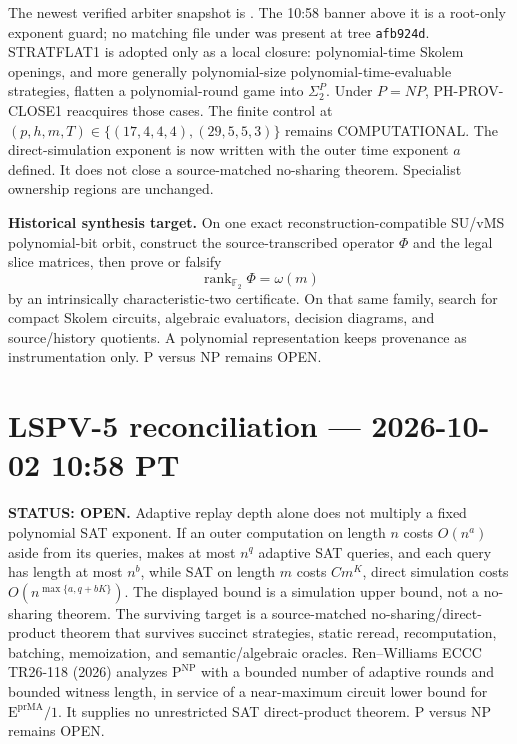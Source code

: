 \documentclass[11pt]{article}
\begin{document}
The newest verified arbiter snapshot is
. The 10:58 banner above it is a root-only
exponent guard; no matching file under  was present at tree
\texttt{afb924d}. STRATFLAT1 is adopted only as a local closure: polynomial-time Skolem
openings, and more generally polynomial-size polynomial-time-evaluable strategies, flatten a
polynomial-round game into $\Sigma_2^P$. Under $P=NP$, PH-PROV-CLOSE1 reacquires those cases.
The finite control at $(p,h,m,T)\in\{(17,4,4,4),(29,5,5,3)\}$ remains COMPUTATIONAL.
The direct-simulation exponent is now written with the outer time exponent $a$ defined. It does
not close a source-matched no-sharing theorem. Specialist ownership regions are unchanged.

\begin{candidatebox}
\textbf{Historical synthesis target.}
On one exact reconstruction-compatible SU/vMS polynomial-bit orbit, construct the
source-transcribed operator $\Phi$ and the legal slice matrices, then prove or falsify
\[
\operatorname{rank}_{\mathbb F_2}\Phi=\omega(m)
\]
by an intrinsically characteristic-two certificate. On that same family, search for compact
Skolem circuits, algebraic evaluators, decision diagrams, and source/history quotients. A
polynomial representation keeps provenance as instrumentation only. P versus NP remains OPEN.
\end{candidatebox}



\section{LSPV-5 reconciliation --- 2026-10-02 10:58 PT}
\textbf{STATUS: OPEN.} Adaptive replay depth alone does not multiply a fixed polynomial SAT exponent. If an outer computation on length $n$ costs $O(n^a)$ aside from its queries, makes at most $n^q$ adaptive SAT queries, and each query has length at most $n^b$, while SAT on length $m$ costs $Cm^K$, direct simulation costs $O(n^{\max\{a,q+bK\}})$. The displayed bound is a simulation upper bound, not a no-sharing theorem. The surviving target is a source-matched no-sharing/direct-product theorem that survives succinct strategies, static reread, recomputation, batching, memoization, and semantic/algebraic oracles. Ren--Williams ECCC TR26-118 (2026) analyzes $\mathrm{P}^{\mathrm{NP}}$ with a bounded number of adaptive rounds and bounded witness length, in service of a near-maximum circuit lower bound for $\mathrm{E}^{\mathrm{prMA}}/1$. It supplies no unrestricted SAT direct-product theorem. P versus NP remains OPEN.
\end{document}

